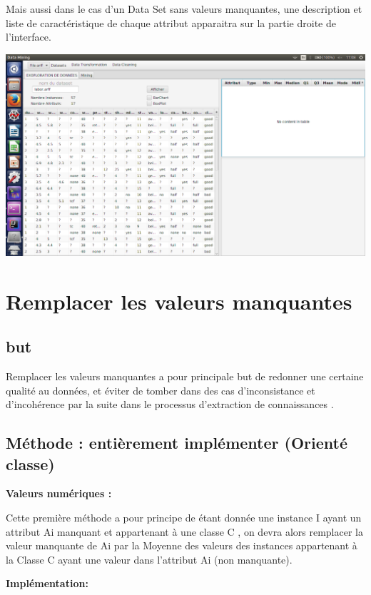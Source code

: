 \documentclass[12pt,a4paper,oneside]{book}
\begin{document}
	Mais aussi dans le cas d'un Data Set sans valeurs manquantes, une description et liste de caractéristique de chaque attribut apparaitra sur la partie droite de l'interface.
	
	\begin{center}
		\includegraphics[width=1\textwidth]{screens/avantMissing.png}%
		\label{labelname}%
	\end{center}
	
	
	\section{Remplacer les valeurs manquantes}
	\subsection{but}
	Remplacer les valeurs manquantes a pour principale but de redonner une certaine qualité au données, et éviter de tomber dans des cas d'inconsistance et d'incohérence par la suite dans le processus d'extraction de connaissances .
	
	\subsection{Méthode : entièrement implémenter (Orienté classe)}
	
	\textbf{Valeurs numériques :}
	
	Cette première méthode a pour principe de étant donnée une instance I ayant un attribut Ai manquant et appartenant à une classe C , on devra alors remplacer la valeur manquante de Ai par la Moyenne des valeurs des instances appartenant à la Classe C ayant une valeur dans l'attribut Ai (non manquante).
	
	\textbf{Implémentation:}
	
\end{document}
